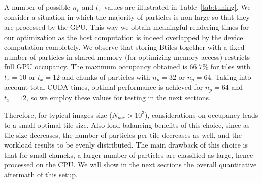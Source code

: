 \documentclass[smallextended]{svjour3}
\begin{document}
A number of possible $n_p$ and $t_x$ values are illustrated in Table~\ref{tab:tuning}. We consider a situation in which the majority of particles is non-large so that they are processed by the GPU. This way we obtain meaningful rendering times for our optimization as the host computation is indeed overlapped by the device computation completely. We observe that storing Btiles together with a fixed number of particles in shared memory (for optimizing memory access) restricts full GPU occupancy. The maximum occupancy obtained is $66.7\%$ for tiles with $t_x = 10$ or $t_x = 12$ and chunks of particles with $n_p = 32$ or $n_p=64$. Taking into account total CUDA times, optimal performance is achieved for $n_p=64$ and $t_x = 12$, so we employ these values for testing in the next sections.

Therefore, for typical images size ($N_{pix} > 10^3$), considerations on occupancy leads to a small optimal tile size. Also load balancing benefits of this choice, since 
as tile size decreases, the number of particles per tile decreases as well, and the workload results to be evenly distributed.
The main drawback of this choice is that for small chuncks, a larger number of particles are classified as large, hence processed on the CPU. We will show in the next sections the overall quantitative aftermath of this setup.  
\end{document}
